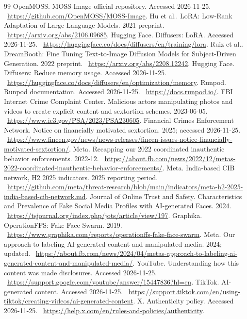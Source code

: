 \documentclass[10pt,a4paper]{article}
\begin{document}
\begin{thebibliography}{99}
 OpenMOSS. MOSS-Image official repository. Accessed 2026-11-25. \ \url{https://github.com/OpenMOSS/MOSS-Image}.
 Hu et al.. LoRA: Low-Rank Adaptation of Large Language Models. 2021 preprint. \ \url{https://arxiv.org/abs/2106.09685}.
 Hugging Face. Diffusers: LoRA. Accessed 2026-11-25. \ \url{https://huggingface.co/docs/diffusers/en/training/lora}.
 Ruiz et al.. DreamBooth: Fine Tuning Text-to-Image Diffusion Models for Subject-Driven Generation. 2022 preprint. \ \url{https://arxiv.org/abs/2208.12242}.
 Hugging Face. Diffusers: Reduce memory usage. Accessed 2026-11-25. \ \url{https://huggingface.co/docs/diffusers/en/optimization/memory}.
 Runpod. Runpod documentation. Accessed 2026-11-25. \ \url{https://docs.runpod.io/}.
 FBI Internet Crime Complaint Center. Malicious actors manipulating photos and videos to create explicit content and sextortion schemes. 2023-06-05. \ \url{https://www.ic3.gov/PSA/2023/PSA230605}.
 Financial Crimes Enforcement Network. Notice on financially motivated sextortion. 2025; accessed 2026-11-25. \ \url{https://www.fincen.gov/news/news-releases/fincen-issues-notice-financially-motivated-sextortion/}.
 Meta. Recapping our 2022 coordinated inauthentic behavior enforcements. 2022-12. \ \url{https://about.fb.com/news/2022/12/metas-2022-coordinated-inauthentic-behavior-enforcements/}.
 Meta. India-based CIB network, H2 2025 indicators. 2025 reporting period. \ \url{https://github.com/meta/threat-research/blob/main/indicators/meta-h2-2025-india-based-cib-network.md}.
 Journal of Online Trust and Safety. Characteristics and Prevalence of Fake Social Media Profiles with AI-generated Faces. 2024. \ \url{https://tsjournal.org/index.php/jots/article/view/197}.
 Graphika. OperationFFS: Fake Face Swarm. 2019. \ \url{https://www.graphika.com/reports/operationffs-fake-face-swarm}.
 Meta. Our approach to labeling AI-generated content and manipulated media. 2024; updated. \ \url{https://about.fb.com/news/2024/04/metas-approach-to-labeling-ai-generated-content-and-manipulated-media/}.
 YouTube. Understanding how this content was made disclosures. Accessed 2026-11-25. \ \url{https://support.google.com/youtube/answer/15447836?hl=en}.
 TikTok. AI-generated content. Accessed 2026-11-25. \ \url{https://support.tiktok.com/en/using-tiktok/creating-videos/ai-generated-content}.
 X. Authenticity policy. Accessed 2026-11-25. \ \url{https://help.x.com/en/rules-and-policies/authenticity}.

\end{thebibliography}
\end{document}
